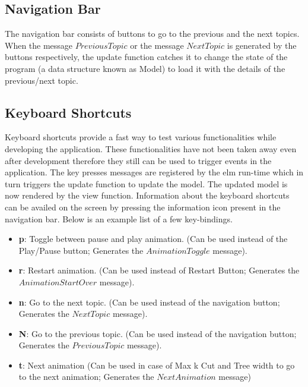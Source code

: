 \subsection{Navigation Bar}
The navigation bar consists of buttons to go to the previous and the next
topics.  When the message $PreviousTopic$ or the message $NextTopic$ is
generated by the buttons respectively, the update function catches it to change
the state of the program (a data structure known as Model) to load it with the
details of the previous/next topic.

\subsection{Keyboard Shortcuts}
Keyboard shortcuts provide a fast way to test various functionalities while
developing the application.  These functionalities have not been taken away
even after development therefore they still can be used to trigger events in
the application. 
The key presses messages are registered by the elm run-time which in turn
triggers the update function to update the model. The updated model is now
rendered by the view function. Information about the keyboard shortcuts can be
availed on the screen by pressing the information icon present in the
navigation bar. Below is an example list of a few key-bindings.

\begin{itemize}
\item \textbf{p}: Toggle between pause and play animation. (Can be used instead of the Play/Pause button; Generates the $AnimationToggle$ message). \\
\item \textbf{r}: Restart animation. (Can be used instead of Restart Button; Generates the $AnimationStartOver$ message). \\
\item \textbf{n}: Go to the next topic. (Can be used instead of the navigation button; Generates the $NextTopic$ message). \\
\item \textbf{N}: Go to the previous topic. (Can be used instead of the navigation button; Generates the $PreviousTopic$ message). \\
\item \textbf{t}: Next animation (Can be used in case of Max k Cut and Tree width to go to the next animation; Generates the $NextAnimation$ message)
\end{itemize}

